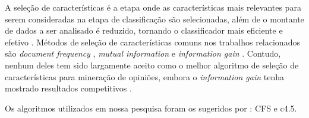 \documentclass[template.tex]{subfiles}
\begin{document}

A seleção de características é a etapa onde as características mais relevantes para serem consideradas na etapa de classificação são selecionadas, além de o montante de dados a ser analisado é reduzido, tornando o classificador mais eficiente e efetivo \cite{moraes2012document}. Métodos de seleção de características comuns nos trabalhos relacionados são \textit{document frequency} \cite{pang2002thumbs}, \textit{mutual information} \cite{turney2002thumbs} e \textit{information gain} \cite{wiebe2006word}.  Contudo, nenhum deles tem sido largamente aceito como o melhor algoritmo de seleção de características para mineração de opiniões, embora o \textit{information gain} tenha mostrado resultados competitivos \cite{moraes2012document}.


Os algoritmos utilizados em nossa pesquisa foram os sugeridos por : CFS e c4.5.
\end{document}
